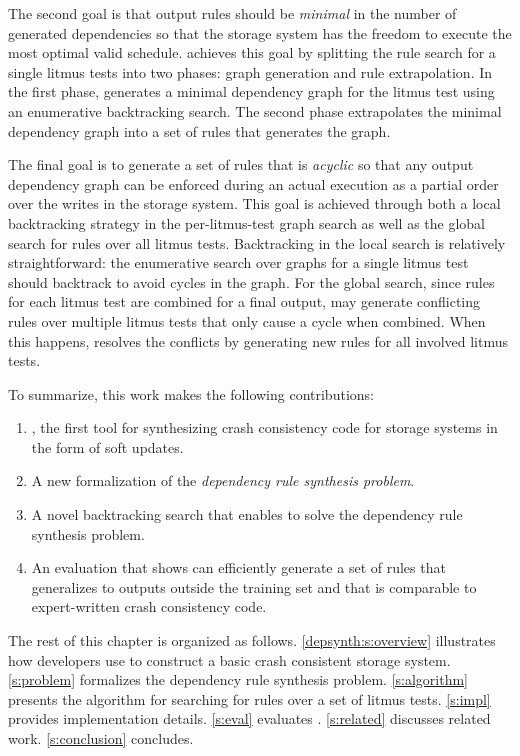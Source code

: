 The second goal is that output rules should be \textit{minimal} in the number of generated dependencies
so that the storage system has the freedom to execute the most optimal valid schedule. \depsynth achieves this
goal by splitting the rule search for a single litmus tests into two phases: graph generation and rule
extrapolation. In the first phase, \depsynth generates a minimal dependency graph for the litmus test
using an enumerative backtracking search. The second phase extrapolates the minimal dependency graph
into a set of rules that generates the graph.

The final goal is to generate a set of rules that is \textit{acyclic} so that any output dependency graph
can be enforced during an actual execution as a partial order over the writes in the storage system.
This goal is achieved through both a local backtracking strategy in the per-litmus-test graph search
as well as the global search for rules over all litmus tests. Backtracking in the local search is
relatively straightforward: the enumerative search over graphs for a single litmus test should backtrack
to avoid cycles in the graph. For the global search, since rules for each litmus test are combined for a
final output, \depsynth may
generate conflicting rules over multiple litmus tests that only cause a cycle when combined.
When this happens, \depsynth resolves the conflicts by generating new rules for all
involved litmus tests.

To summarize, this work makes the following contributions:
\begin{enumerate}
  \item \depsynth, the first tool for synthesizing crash consistency code for storage systems
        in the form of soft updates.
  \item A new formalization of the \textit{dependency rule synthesis problem}. %
  \item A novel backtracking search that enables \depsynth to solve the dependency rule synthesis problem.
  \item An evaluation that shows \depsynth can efficiently generate a set of rules that generalizes
        to outputs outside the training set and that is comparable to expert-written crash consistency code.
\end{enumerate}

The rest of this chapter is organized as follows.
\autoref{depsynth:s:overview} illustrates how developers use \depsynth to construct a basic crash consistent storage system.
\autoref{s:problem} formalizes the dependency rule synthesis problem.
\autoref{s:algorithm} presents the \depsynth algorithm for searching for rules over a set of litmus tests.
\autoref{s:impl} provides implementation details.
\autoref{s:eval} evaluates \depsynth.
\autoref{s:related} discusses related work.
\autoref{s:conclusion} concludes.
\fi
